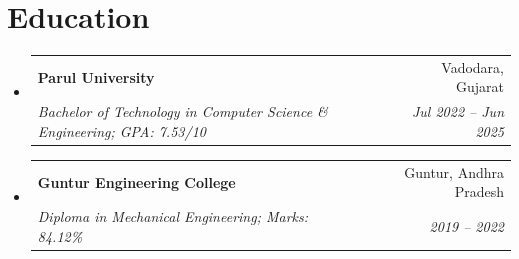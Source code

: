 \documentclass[letterpaper,10pt]{article}
\makeatletter
\newcommand{\resumeSubheading}[4]{
  \vspace{-1pt}\item
    \begin{tabular*}{0.97\textwidth}[t]{l@{\extracolsep{\fill}}r}
      \textbf{#1} & #2 \\
      \textit{\small#3} & \textit{\small #4} \\
    \end{tabular*}\vspace{-6pt}
}
\newcommand{\resumeSubHeadingListStart}{\begin{itemize}[leftmargin=0.15in, label={}]}
\newcommand{\resumeSubHeadingListEnd}{\end{itemize}\vspace{-2pt}}
\makeatother
\begin{document}
\section{Education}
  \resumeSubHeadingListStart
    \resumeSubheading
      {Parul University}{Vadodara, Gujarat}
      {Bachelor of Technology in Computer Science \& Engineering; GPA: 7.53/10}{Jul 2022 -- Jun 2025}
    \resumeSubheading
      {Guntur Engineering College}{Guntur, Andhra Pradesh}
      {Diploma in Mechanical Engineering; Marks: 84.12\%}{2019 -- 2022}
  \resumeSubHeadingListEnd
\end{document}
